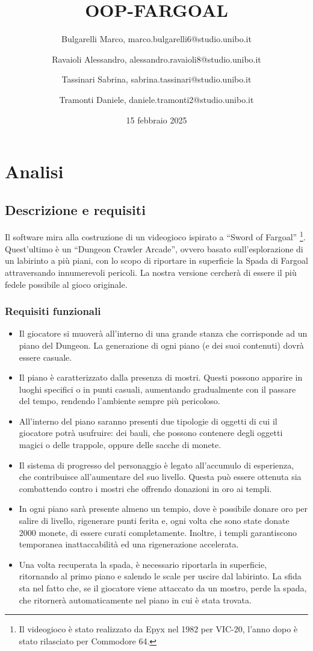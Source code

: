 \documentclass{report}
\title{OOP-FARGOAL}
\author{
    Bulgarelli Marco, marco.bulgarelli6@studio.unibo.it \and 
    Ravaioli Alessandro, alessandro.ravaioli8@studio.unibo.it \and
    Tassinari Sabrina, sabrina.tassinari@studio.unibo.it \and
    Tramonti Daniele, daniele.tramonti2@studio.unibo.it 
}
\date{15 febbraio 2025}
\begin{document}
\maketitle

\tableofcontents

\chapter{Analisi}

\section{Descrizione e requisiti}

Il software mira alla costruzione di un videogioco ispirato a “Sword of Fargoal” \footnote{
    Il videogioco è stato realizzato da Epyx nel 1982 per VIC-20, l'anno dopo è stato rilasciato per Commodore 64.
}. 
%
Quest’ultimo è un “Dungeon Crawler Arcade”, ovvero basato sull’esplorazione di un labirinto a più piani, con lo scopo di riportare in superficie la Spada di Fargoal attraversando innumerevoli pericoli. 
%
La nostra versione cercherà di essere il più fedele possibile al gioco originale.

\subsection{Requisiti funzionali}
\begin{itemize}
    \item Il giocatore si muoverà all’interno di una grande stanza che corrisponde ad un piano del Dungeon. La generazione di ogni piano (e dei suoi contenuti) dovrà essere casuale.
    \item Il piano è caratterizzato dalla presenza di mostri. Questi possono apparire in luoghi specifici o in punti casuali, aumentando gradualmente con il passare del tempo, rendendo l’ambiente sempre più pericoloso.
    \item All’interno del piano saranno presenti due tipologie di oggetti di cui il giocatore potrà usufruire: dei bauli, che possono contenere degli oggetti magici o delle trappole, oppure delle sacche di monete.
    \item Il sistema di progresso del personaggio è legato all’accumulo di esperienza, che contribuisce all’aumentare del suo livello. Questa può essere ottenuta sia combattendo contro i mostri che offrendo donazioni in oro ai templi.
    \item In ogni piano sarà presente almeno un tempio, dove è possibile donare oro per salire di livello, rigenerare punti ferita e, ogni volta che sono state donate 2000 monete, di essere curati completamente. Inoltre, i templi garantiscono temporanea inattaccabilità ed una rigenerazione accelerata.
    \item Una volta recuperata la spada, è necessario riportarla in superficie, ritornando al primo piano e salendo le scale per uscire dal labirinto. La sfida sta nel fatto che, se il giocatore viene attaccato da un mostro, perde la spada, che ritornerà automaticamente nel piano in cui è stata trovata.
\end{itemize}
\end{document}
